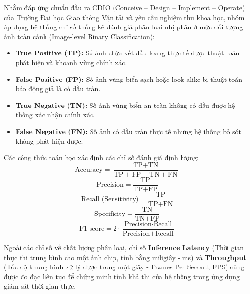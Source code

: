 Nhằm đáp ứng chuẩn đầu ra CDIO (Conceive -- Design -- Implement -- Operate) của Trường Đại học Giao thông Vận tải và yêu cầu nghiệm thu khoa học, nhóm áp dụng hệ thống chỉ số thống kê đánh giá phân loại nhị phân ở mức đối tượng ảnh toàn cảnh (Image-level Binary Classification):
\begin{itemize}
    \item \textbf{True Positive (TP):} Số ảnh chứa vết dầu loang thực tế được thuật toán phát hiện và khoanh vùng chính xác.
    \item \textbf{False Positive (FP):} Số ảnh vùng biển sạch hoặc look-alike bị thuật toán báo động giả là có dầu tràn.
    \item \textbf{True Negative (TN):} Số ảnh vùng biển an toàn không có dầu được hệ thống xác nhận chính xác.
    \item \textbf{False Negative (FN):} Số ảnh có dầu tràn thực tế nhưng hệ thống bỏ sót không phát hiện được.
\end{itemize}

Các công thức toán học xác định các chỉ số đánh giá định lượng:
\begin{equation}
    \text{Accuracy} = \frac{\text{TP} + \text{TN}}{\text{TP} + \text{FP} + \text{TN} + \text{FN}}
    \label{eq:accuracy}
\end{equation}
\begin{equation}
    \text{Precision} = \frac{\text{TP}}{\text{TP} + \text{FP}}
    \label{eq:precision}
\end{equation}
\begin{equation}
    \text{Recall (Sensitivity)} = \frac{\text{TP}}{\text{TP} + \text{FN}}
    \label{eq:recall}
\end{equation}
\begin{equation}
    \text{Specificity} = \frac{\text{TN}}{\text{TN} + \text{FP}}
    \label{eq:specificity}
\end{equation}
\begin{equation}
    \text{F1-score} = 2 \cdot \frac{\text{Precision} \cdot \text{Recall}}{\text{Precision} + \text{Recall}}
    \label{eq:f1_score}
\end{equation}

Ngoài các chỉ số về chất lượng phân loại, chỉ số \textbf{Inference Latency} (Thời gian thực thi trung bình cho một ảnh chip, tính bằng miligiây - ms) và \textbf{Throughput} (Tốc độ khung hình xử lý được trong một giây - Frames Per Second, FPS) cũng được đo đạc liên tục để chứng minh tính khả thi của hệ thống trong ứng dụng giám sát thời gian thực.

